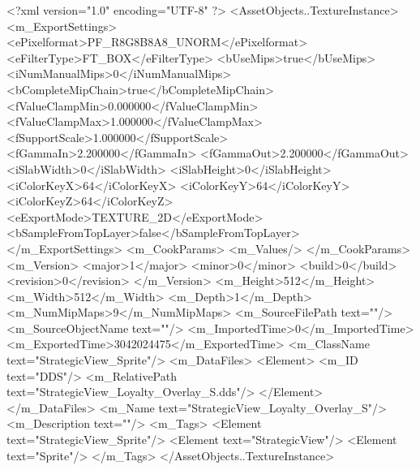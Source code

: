 <?xml version="1.0" encoding="UTF-8" ?>
<AssetObjects..TextureInstance>
	<m_ExportSettings>
		<ePixelformat>PF_R8G8B8A8_UNORM</ePixelformat>
		<eFilterType>FT_BOX</eFilterType>
		<bUseMips>true</bUseMips>
		<iNumManualMips>0</iNumManualMips>
		<bCompleteMipChain>true</bCompleteMipChain>
		<fValueClampMin>0.000000</fValueClampMin>
		<fValueClampMax>1.000000</fValueClampMax>
		<fSupportScale>1.000000</fSupportScale>
		<fGammaIn>2.200000</fGammaIn>
		<fGammaOut>2.200000</fGammaOut>
		<iSlabWidth>0</iSlabWidth>
		<iSlabHeight>0</iSlabHeight>
		<iColorKeyX>64</iColorKeyX>
		<iColorKeyY>64</iColorKeyY>
		<iColorKeyZ>64</iColorKeyZ>
		<eExportMode>TEXTURE_2D</eExportMode>
		<bSampleFromTopLayer>false</bSampleFromTopLayer>
	</m_ExportSettings>
	<m_CookParams>
		<m_Values/>
	</m_CookParams>
	<m_Version>
		<major>1</major>
		<minor>0</minor>
		<build>0</build>
		<revision>0</revision>
	</m_Version>
	<m_Height>512</m_Height>
	<m_Width>512</m_Width>
	<m_Depth>1</m_Depth>
	<m_NumMipMaps>9</m_NumMipMaps>
	<m_SourceFilePath text=""/>
	<m_SourceObjectName text=""/>
	<m_ImportedTime>0</m_ImportedTime>
	<m_ExportedTime>3042024475</m_ExportedTime>
	<m_ClassName text="StrategicView_Sprite"/>
	<m_DataFiles>
		<Element>
			<m_ID text="DDS"/>
			<m_RelativePath text="StrategicView_Loyalty_Overlay_{S}.dds"/>
		</Element>
	</m_DataFiles>
	<m_Name text="StrategicView_Loyalty_Overlay_{S}"/>
	<m_Description text=""/>
	<m_Tags>
		<Element text="StrategicView_Sprite"/>
		<Element text="StrategicView"/>
		<Element text="Sprite"/>
	</m_Tags>
</AssetObjects..TextureInstance>

